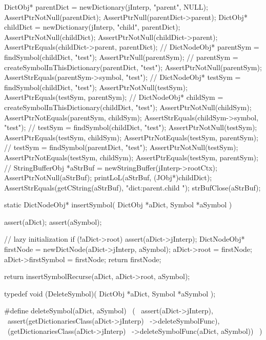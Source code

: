   DictObj* parentDict = newDictionary(jInterp, "parent", NULL);
  AssertPtrNotNull(parentDict);
  AssertPtrNull(parentDict->parent);
  DictObj* childDict  = newDictionary(jInterp, "child", parentDict);
  AssertPtrNotNull(childDict);
  AssertPtrNotNull(childDict->parent);
  AssertPtrEquals(childDict->parent, parentDict);
  //
  DictNodeObj* parentSym = findSymbol(childDict, "test");
  AssertPtrNull(parentSym);
  //
  parentSym = 
    createSymbolInThisDictionary(parentDict, "test");
  AssertPtrNotNull(parentSym);
  AssertStrEquals(parentSym->symbol, "test");
  //
  DictNodeObj* testSym = findSymbol(childDict, "test");
  AssertPtrNotNull(testSym);
  AssertPtrEquals(testSym, parentSym);
  //
  DictNodeObj* childSym =
    createSymbolInThisDictionary(childDict, "test");
  AssertPtrNotNull(childSym);
  AssertPtrNotEquals(parentSym, childSym);
  AssertStrEquals(childSym->symbol, "test");
  //
  testSym = findSymbol(childDict, "test");
  AssertPtrNotNull(testSym);
  AssertPtrEquals(testSym, childSym);
  AssertPtrNotEquals(testSym, parentSym);
  //
  testSym = findSymbol(parentDict, "test");
  AssertPtrNotNull(testSym);
  AssertPtrNotEquals(testSym, childSym);
  AssertPtrEquals(testSym, parentSym);
  //
  StringBufferObj *aStrBuf = newStringBuffer(jInterp->rootCtx);
  AssertPtrNotNull(aStrBuf);
  printLoL(aStrBuf, (JObj*)childDict);
  AssertStrEquals(getCString(aStrBuf), "dict:parent.child ");
  strBufClose(aStrBuf);  
\stopCTest
\stopTestCase
\stopTestSuite

\startTestSuite[insertSymbol]

\startCCode
static DictNodeObj* insertSymbol(
  DictObj *aDict,
  Symbol  *aSymbol
) {
  assert(aDict);
  assert(aSymbol);

  // lazy initialization
  if (!aDict->root) {
    assert(aDict->jInterp);
    DictNodeObj* firstNode = newDictNode(aDict->jInterp, aSymbol);
    aDict->root            = firstNode;
    aDict->firstSymbol     = firstNode;
    return firstNode;
  }

  return insertSymbolRecurse(aDict, aDict->root, aSymbol);
}
\stopCCode
\stopTestSuite

\startTestSuite[deleteSymbol]

\startCHeader
typedef void (DeleteSymbol)(
  DictObj *aDict,
  Symbol  *aSymbol
);

#define deleteSymbol(aDict, aSymbol)            \
  (                                             \
    assert(aDict->jInterp),                     \
    assert(getDictionariesClass(aDict->jInterp) \
      ->deleteSymbolFunc),                      \
    (getDictionariesClass(aDict->jInterp)       \
      ->deleteSymbolFunc(aDict, aSymbol))       \
  )
\stopCHeader

